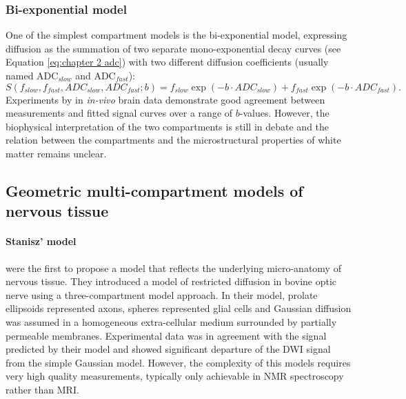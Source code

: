 \subsubsection{Bi-exponential model}
One of the simplest compartment models is the bi-exponential model, expressing diffusion as the summation of two separate mono-exponential decay curves (see Equation \ref{eq:chapter 2 adc}) with two different diffusion coefficients (usually named \gls{ADC}$_{slow}$ and \gls{ADC}$_{fast}$):
{\footnotesize
\begin{equation}
	S(f_{slow},f_{fast},ADC_{slow},ADC_{fast}; b) = f_{slow} \exp(-b\cdot ADC_{slow}) + f_{fast} \exp(-b\cdot ADC_{fast}).
\end{equation}
}
Experiments by \citet{Clark:2002} in \emph{in-vivo} brain data demonstrate good agreement between measurements and fitted signal curves over a range of $b$-values. However, the biophysical interpretation of the two compartments is still in debate and the relation between the compartments and the microstructural properties of white matter remains unclear. 
\subsection{Geometric multi-compartment models of nervous tissue}
\paragraph*{Stanisz' model}
\citet{Stanisz:1997} were the first to propose a model that reflects the underlying micro-anatomy of nervous tissue. They introduced a model of restricted diffusion in bovine optic nerve using a three-compartment model approach. In their model, prolate ellipsoids represented axons, spheres represented glial cells and Gaussian diffusion was assumed in a homogeneous extra-cellular medium surrounded by partially permeable membranes. Experimental data was in agreement with the signal predicted by their model and showed significant departure of the {\gls{DWI}} signal from the simple Gaussian model. However, the complexity of this models requires very high quality measurements, typically only achievable in \gls{NMR} spectroscopy rather than MRI.
